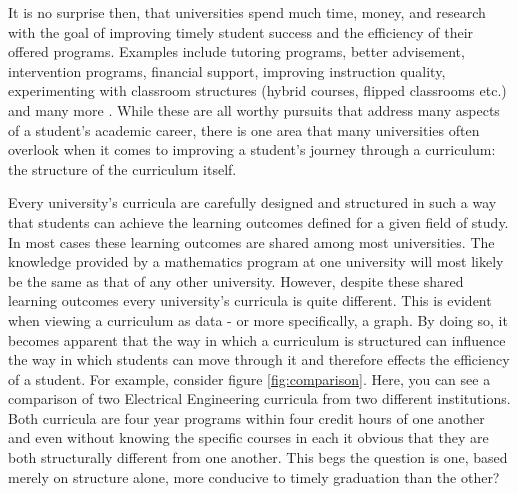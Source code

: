 \documentclass[botnum, fleqn]{unmeethesis}
\begin{document}
  It is no surprise then, that universities spend much time, money, and research with the goal of improving timely student success and the efficiency of their offered programs. Examples include tutoring programs, better advisement, intervention programs, financial support, improving instruction quality, experimenting with classroom structures (hybrid courses, flipped classrooms etc.) and many more \cite{o2015use,topping1996effectiveness,hunter2004could,king2002identifying,lewallen1993early}. While these are all worthy pursuits that address many aspects of a student's academic career, there is one area that many universities often overlook when it comes to improving a student's journey through a curriculum: the structure of the curriculum itself.

  Every university's curricula are carefully designed and structured in such a way that students can achieve the learning outcomes defined for a given field of study. In most cases these learning outcomes are shared among most universities. The knowledge provided by a mathematics program at one university will most likely be the same as that of any other university. However, despite these shared learning outcomes every university's curricula is quite different. This is evident when viewing a curriculum as data - or more specifically, a graph. By doing so, it becomes apparent that the way in which a curriculum is structured can influence the way in which students can move through it and therefore effects the efficiency of a student. For example, consider figure \ref{fig:comparison}. Here, you can see a comparison of two Electrical Engineering curricula from two different institutions. Both curricula are four year programs within four credit hours of one another and even without knowing the specific courses in each it obvious that they are both structurally different from one another. This begs the question is one, based merely on structure alone, more conducive to timely graduation than the other?
\end{document}
